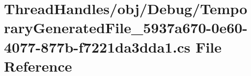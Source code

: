 \hypertarget{_thread_handles_2obj_2_debug_2_temporary_generated_file__5937a670-0e60-4077-877b-f7221da3dda1_8cs}{}\section{Thread\+Handles/obj/\+Debug/\+Temporary\+Generated\+File\+\_\+5937a670-\/0e60-\/4077-\/877b-\/f7221da3dda1.cs File Reference}
\label{_thread_handles_2obj_2_debug_2_temporary_generated_file__5937a670-0e60-4077-877b-f7221da3dda1_8cs}
